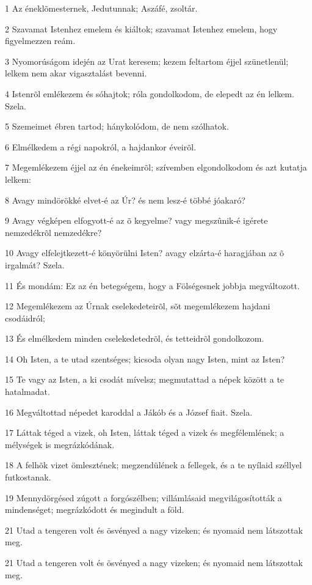 \par 1 Az éneklõmesternek, Jedutunnak; Aszáfé, zsoltár.
\par 2 Szavamat Istenhez emelem és kiáltok; szavamat Istenhez emelem, hogy figyelmezzen reám.
\par 3 Nyomorúságom idején az Urat keresem; kezem feltartom éjjel szünetlenül; lelkem nem akar vigasztalást bevenni.
\par 4 Istenrõl emlékezem és sóhajtok; róla gondolkodom, de elepedt az én lelkem. Szela.
\par 5 Szemeimet ébren tartod; hánykolódom, de nem szólhatok.
\par 6 Elmélkedem a régi napokról, a hajdankor éveirõl.
\par 7 Megemlékezem éjjel az én énekeimrõl; szívemben elgondolkodom és azt kutatja lelkem:
\par 8 Avagy mindörökké elvet-é az Úr? és nem lesz-é többé jóakaró?
\par 9 Avagy végképen elfogyott-é az õ kegyelme? vagy megszûnik-é igérete nemzedékrõl nemzedékre?
\par 10 Avagy elfelejtkezett-é könyörülni Isten? avagy elzárta-é haragjában az õ irgalmát? Szela.
\par 11 És mondám: Ez az én betegségem, hogy a Fölségesnek jobbja megváltozott.
\par 12 Megemlékezem az Úrnak cselekedeteirõl, sõt megemlékezem hajdani csodáidról;
\par 13 És elmélkedem minden cselekedetedrõl, és tetteidrõl gondolkozom.
\par 14 Oh Isten, a te utad szentséges; kicsoda olyan nagy Isten, mint az Isten?
\par 15 Te vagy az Isten, a ki csodát mívelsz; megmutattad a népek között a te hatalmadat.
\par 16 Megváltottad népedet karoddal a Jákób és a József fiait. Szela.
\par 17 Láttak téged a vizek, oh Isten, láttak téged a vizek és megfélemlének; a mélységek is megrázkódának.
\par 18 A felhõk vizet ömlesztének; megzendülének a fellegek, és a te nyílaid széllyel futkostanak.
\par 19 Mennydörgésed zúgott a forgószélben; villámlásaid megvilágosították a mindenséget; megrázkódott és megindult a föld.
\par 21 Utad a tengeren volt és ösvényed a nagy vizeken; és nyomaid nem látszottak meg.
\par 21 Utad a tengeren volt és ösvényed a nagy vizeken; és nyomaid nem látszottak meg.

